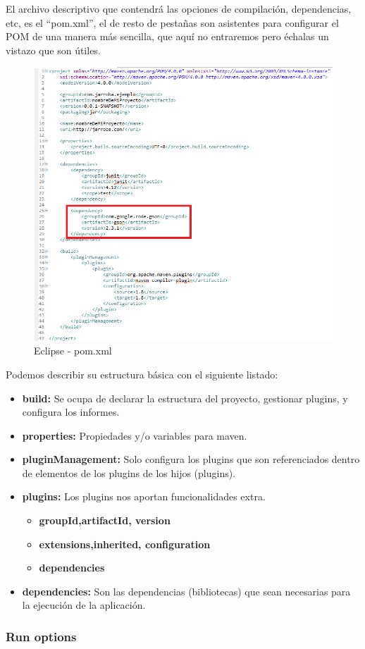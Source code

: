 El archivo descriptivo que contendrá las opciones de compilación, dependencias, etc, es el “pom.xml”, el de resto de pestañas son asistentes para configurar el POM de una manera más sencilla, que aquí no entraremos pero échalas un vistazo que son útiles.

\begin{figure}[H]
	\centering
	\includegraphics[width=0.5\linewidth]{figuras/maven/maven2}
	\caption{Eclipse - pom.xml}
	\label{fig:mvn2}
\end{figure}

Podemos describir su estructura básica con el siguiente listado:

\begin{itemize}
	\item \textbf{build:} Se ocupa de declarar la estructura del proyecto, gestionar plugins, y configura los informes.
	\item \textbf{properties:} Propiedades y/o variables para maven.
	\item \textbf{pluginManagement:} Solo configura los plugins que son referenciados dentro de elementos de los plugins de los hijos (plugins).
	\item \textbf{plugins:} Los plugins nos aportan funcionalidades extra.
	\begin{itemize}
		\item \textbf{groupId,artifactId, version}
		\item \textbf{extensions,inherited, configuration}
		\item \textbf{dependencies} 
	\end{itemize}
	\item \textbf{dependencies:} Son las dependencias (bibliotecas) que sean necesarias para la ejecución de la aplicación.
\end{itemize}

\subsubsection{Run options}

